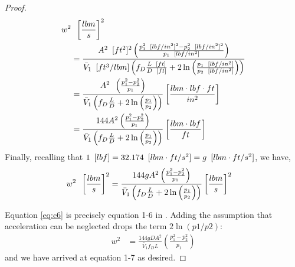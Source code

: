 \documentclass{psig_required_latex_files/psig}
\begin{document}
\begin{proof}
\begin{align}
w^2 &\enskip \left[\frac{lbm}{s}\right]^2 \\
&= \frac{A^2 \enskip [ft^2]^2 \left(\frac{p_1^2 \enskip [lbf/in^2]^2 - p_2^2 \enskip [lbf/in^2]^2}{p_1 \enskip [lbf/in^2]} \right)}{\bar V_1 \enskip [ft^3/lbm] \left(f_D\frac{L \enskip [ft]}{D \enskip [ft]} + 2\ln\left(\frac{p_1 \enskip [lbf/in^2]}{p_2\enskip [lbf/in^2]} \right)\right)} \\
&= \frac{A^2 \enskip \left(\frac{p_1^2  - p_2^2}{p_1 } \right)}{\bar V_1 \left(f_D\frac{L}{D } + 2\ln\left(\frac{p_1 }{p_2} \right)\right)}\left[\frac{lbm \cdot lbf \cdot ft}{in^2}\right] \\
&= \frac{144  A^2  \left(\frac{p_1^2  - p_2^2}{p_1 } \right)}{\bar V_1 \left(f_D\frac{L}{D } + 2\ln\left(\frac{p_1 }{p_2} \right)\right)}\left[\frac{lbm \cdot lbf}{ft}\right]
\end{align}
Finally, recalling that $1 \enskip [lbf] = 32.174 \enskip [lbm \cdot ft/s^2] = g \enskip [lbm \cdot ft/s^2]$, we have,
\begin{align}\label{eq:c6}
w^2 \enskip \left[\frac{lbm}{s}\right]^2 &= \frac{ 144g A^2  \left(\frac{p_1^2  - p_2^2}{p_1 } \right)}{\bar V_1 \left(f_D\frac{L}{D } + 2\ln\left(\frac{p_1 }{p_2} \right)\right)}\left[\frac{lbm}{s}\right]^2
\end{align}

Equation \ref{eq:c6} is precisely equation 1-6 in \cite{crane1980flow}.  Adding the assumption that acceleration can be neglected drops the term $2\ln(p1/p2)$:
\begin{align}\label{eq:c7}
w^2  &= \frac{ 144g D A^2  }{\bar V_1 f_D L }\left(\frac{p_1^2  - p_2^2}{p_1 } \right)
\end{align}
and we have arrived at equation 1-7 as desired.
\end{proof}
\end{document}
